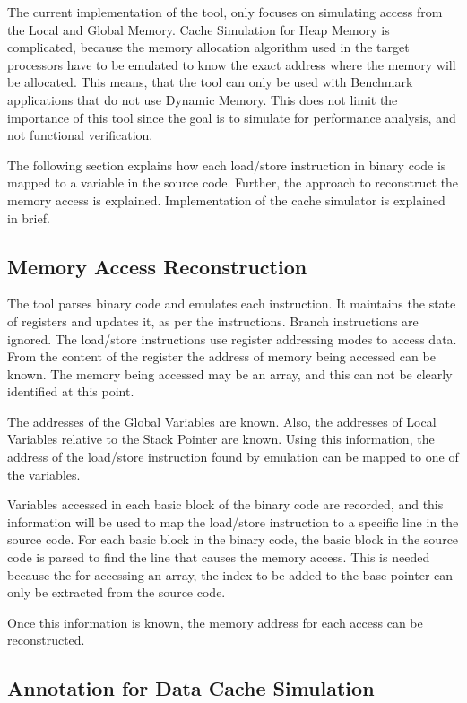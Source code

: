 The current implementation of the tool, only focuses on simulating access from the Local and Global Memory. Cache Simulation for Heap Memory is complicated, because the memory allocation algorithm used in the target processors have to be emulated to know the exact address where the memory will be allocated. This means, that the tool can only be used with Benchmark applications that do not use Dynamic Memory. This does not limit the importance of this tool since the goal is to simulate for performance analysis, and not functional verification. %

The following section explains how each load/store instruction in binary code is mapped to a variable in the source code. Further, the approach to reconstruct the memory access is explained. Implementation of the cache simulator is explained in brief.

\subsection{Memory Access Reconstruction}
The tool parses binary code and emulates each instruction. It maintains the state of registers and updates it, as per the instructions. Branch instructions are ignored. The load/store instructions use register addressing modes to access data. From the content of the register the address of memory being accessed can be known. The memory being accessed may be an array, and this can not be clearly identified at this point.

The addresses of the Global Variables are known. Also, the addresses of Local Variables relative to the Stack Pointer are known. Using this information, the address of the load/store instruction found by emulation can be mapped to one of the variables.

Variables accessed in each basic block of the binary code are recorded, and this information will be used to map the load/store instruction to a specific line in the source code. For each basic block in the binary code, the basic block in the source code is parsed to find the line that causes the memory access. This is needed because the for accessing an array, the index to be added to the base pointer can only be extracted from the source code. 

Once this information is known, the memory address for each access can be reconstructed.

\subsection{Annotation for Data Cache Simulation}
